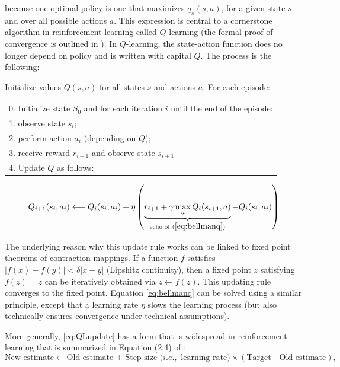 \documentclass[]{krantz}
\theoremstyle{definition}
\theoremstyle{definition}
\theoremstyle{definition}
\theoremstyle{remark}
\begin{document}
because one optimal policy is one that maximizes \(q_\pi(s,a)\), for a
given state \(s\) and over all possible actions \(a\). This expression
is central to a cornerstone algorithm in reinforcement learning called
\(Q\)-learning (the formal proof of convergence is outlined in
\citet{watkins1992q}). In \(Q\)-learning, the state-action function does
no longer depend on policy and is written with capital \(Q\). The
process is the following:

Initialize values \(Q(s,a)\) for all states \(s\) and actions \(a\). For
each episode:\\

\begin{tabular}{l}
0. Initialize state $S_0$ and for each iteration $i$ until the end of the episode:   \\
1. observe state $s_i$;    \\
2. perform action $a_i$ (depending on $Q$);   \\
3. receive reward $r_{i+1}$ and observe state $s_{i+1}$  \\
4. Update $Q$ as follows: 
\end{tabular}

\begin{equation}
\label{eq:QLupdate}
Q_{i+1}(s_i,a_i) \longleftarrow Q_i(s_i,a_i) + \eta  \left(\underbrace{r_{i+1}+\gamma \, \underset{a}{\max} \, Q_i(s_{i+1},a)}_{\text{echo of } (\ref{eq:bellmanq})}-Q_i(s_i,a_i) \right)
\end{equation}

The underlying reason why this update rule works can be linked to fixed
point theorems of contraction mappings. If a function \(f\) satisfies
\(|f(x)-f(y)|< \delta |x-y|\) (Lipshitz continuity), then a fixed point
\(z\) satisfying \(f(z)=z\) can be iteratively obtained via
\(z \leftarrow f(z)\). This updating rule converges to the fixed point.
Equation \eqref{eq:bellmanq} can be solved using a similar principle,
except that a learning rate \(\eta\) slows the learning process (but
also technically ensures convergence under technical assumptions).

More generally, \eqref{eq:QLupdate} has a form that is widespread in
reinforcement learning that is summarized in Equation (2.4) of
\citet{sutton2018reinforcement}: \begin{equation}
\label{eq:RLeq}
\text{New estimate} \leftarrow \text{Old estimate + Step size (}i.e., \text{ learning rate)} \times (\text{Target - Old estimate}),
\end{equation}
\end{document}
